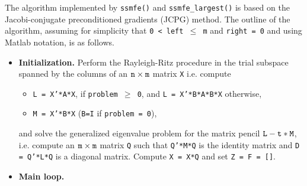 The algorithm implemented by {\tt ssmfe()} and {\tt ssmfe\_largest()}
is based on the Jacobi-conjugate preconditioned gradients (JCPG) method.
The outline of the algorithm,
assuming for simplicity
that {\tt 0 < left $\le$ m} and {\tt right = 0}
and using Matlab notation, is as follows.

\begin{itemize}
\item 
{\bf Initialization.}
Perform the Rayleigh-Ritz procedure
in the trial subspace spanned by the columns of 
an ${\tt n} \times {\tt m}$ matrix {\tt X} i.e. compute 
\begin{itemize}
\item 
{\tt L = X'*A*X},
if {\tt problem $\ge$ 0}, 
and
{\tt L = X'*B*A*B*X} otherwise,
\item
{\tt M = X'*B*X}
({\tt B=I} if {\tt problem = 0}),
\end{itemize}
% 
and solve the generalized eigenvalue problem
for the matrix pencil ${\tt L - t*M}$, i.e.
compute an ${\tt m} \times {\tt m}$ matrix {\tt Q}
such that {\tt Q'*M*Q} is the identity matrix
and {\tt D = Q'*L*Q} is a diagonal matrix.
Compute {\tt X = X*Q} and set {\tt Z = F = []}.
%
\item
{\bf Main loop.} 


\end{itemize}
